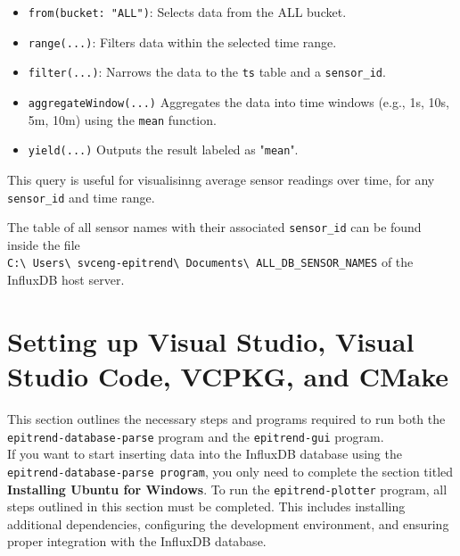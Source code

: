 \documentclass{article}
\begin{document}
\begin{itemize}
    \item \texttt{from(bucket: "ALL")}: Selects data from the ALL bucket.
    \item \texttt{range(...)}: Filters data within the selected time range.
    \item \texttt{filter(...)}: Narrows the data to the \texttt{ts} table and a \texttt{sensor\_id}.
    \item \texttt{aggregateWindow(...)} Aggregates the data into time windows (e.g., 1s, 10s, 5m, 10m) using the \texttt{mean} function.
    \item \texttt{yield(...)} Outputs the result labeled as "\texttt{mean}".
\end{itemize}

\noindent
This query is useful for visualisinng average sensor readings over time, for any \texttt{sensor\_id} and time range.

\noindent The table of all sensor names with their associated \texttt{sensor\_id} can be found inside the file \\ \texttt{C:\textbackslash
Users\textbackslash
svceng-epitrend\textbackslash
Documents\textbackslash
ALL\_DB\_SENSOR\_NAMES} of the InfluxDB host server.



\section{Setting up Visual Studio, Visual Studio Code, VCPKG, and CMake}
This section outlines the necessary steps and programs required to run both the \texttt{epitrend-database-parse} program and the \texttt{epitrend-gui} program. 
\\
\noindent
If you want to start inserting data into the InfluxDB database using the \texttt{epitrend-database-parse program}, you only need to complete the section titled \textbf{Installing Ubuntu for Windows}. To run the \texttt{epitrend-plotter} program, all steps outlined in this section must be completed. This includes installing additional dependencies, configuring the development environment, and ensuring proper integration with the InfluxDB database.
\end{document}
